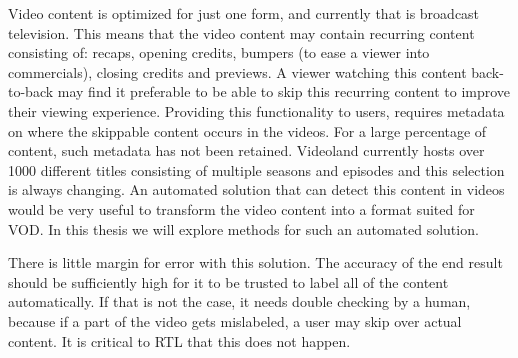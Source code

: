 \documentclass{report}
\begin{document}
Video content is optimized for just one form, and currently that is broadcast television. This means that the video content may contain recurring content consisting of: recaps, opening credits, bumpers (to ease a viewer into commercials), closing credits and previews. A viewer watching this content back-to-back may find it preferable to be able to skip this recurring content to improve their viewing experience. Providing this functionality to users, requires metadata on where the skippable content occurs in the videos. For a large percentage of content, such metadata has not been retained. Videoland currently hosts over 1000 different titles consisting of multiple seasons and episodes and this selection is always changing. An automated solution that can detect this content in videos would be very useful to transform the video content into a format suited for VOD. In this thesis we will explore methods for such an automated solution.

There is little margin for error with this solution. The accuracy of the end result should be sufficiently high for it to be trusted to label all of the content automatically. If that is not the case, it needs double checking by a human, because if a part of the video gets mislabeled, a user may skip over actual content. It is critical to RTL that this does not happen.
\end{document}
